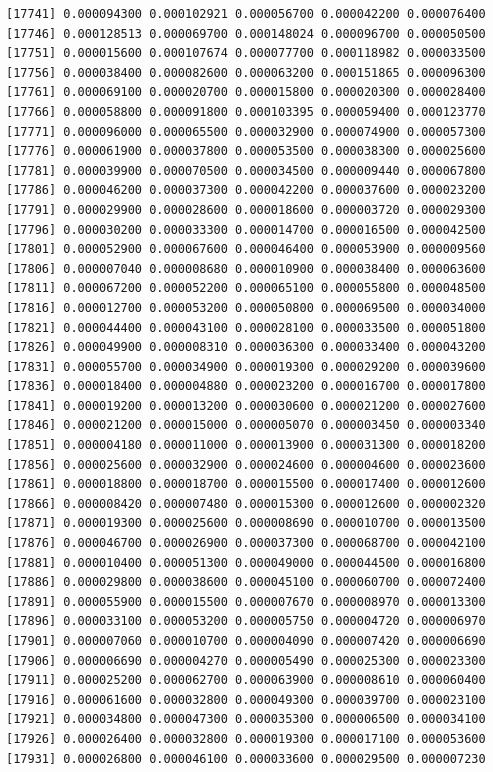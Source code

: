 \documentclass[]{article}
\begin{document}
\begin{verbatim}
[17741] 0.000094300 0.000102921 0.000056700 0.000042200 0.000076400
[17746] 0.000128513 0.000069700 0.000148024 0.000096700 0.000050500
[17751] 0.000015600 0.000107674 0.000077700 0.000118982 0.000033500
[17756] 0.000038400 0.000082600 0.000063200 0.000151865 0.000096300
[17761] 0.000069100 0.000020700 0.000015800 0.000020300 0.000028400
[17766] 0.000058800 0.000091800 0.000103395 0.000059400 0.000123770
[17771] 0.000096000 0.000065500 0.000032900 0.000074900 0.000057300
[17776] 0.000061900 0.000037800 0.000053500 0.000038300 0.000025600
[17781] 0.000039900 0.000070500 0.000034500 0.000009440 0.000067800
[17786] 0.000046200 0.000037300 0.000042200 0.000037600 0.000023200
[17791] 0.000029900 0.000028600 0.000018600 0.000003720 0.000029300
[17796] 0.000030200 0.000033300 0.000014700 0.000016500 0.000042500
[17801] 0.000052900 0.000067600 0.000046400 0.000053900 0.000009560
[17806] 0.000007040 0.000008680 0.000010900 0.000038400 0.000063600
[17811] 0.000067200 0.000052200 0.000065100 0.000055800 0.000048500
[17816] 0.000012700 0.000053200 0.000050800 0.000069500 0.000034000
[17821] 0.000044400 0.000043100 0.000028100 0.000033500 0.000051800
[17826] 0.000049900 0.000008310 0.000036300 0.000033400 0.000043200
[17831] 0.000055700 0.000034900 0.000019300 0.000029200 0.000039600
[17836] 0.000018400 0.000004880 0.000023200 0.000016700 0.000017800
[17841] 0.000019200 0.000013200 0.000030600 0.000021200 0.000027600
[17846] 0.000021200 0.000015000 0.000005070 0.000003450 0.000003340
[17851] 0.000004180 0.000011000 0.000013900 0.000031300 0.000018200
[17856] 0.000025600 0.000032900 0.000024600 0.000004600 0.000023600
[17861] 0.000018800 0.000018700 0.000015500 0.000017400 0.000012600
[17866] 0.000008420 0.000007480 0.000015300 0.000012600 0.000002320
[17871] 0.000019300 0.000025600 0.000008690 0.000010700 0.000013500
[17876] 0.000046700 0.000026900 0.000037300 0.000068700 0.000042100
[17881] 0.000010400 0.000051300 0.000049000 0.000044500 0.000016800
[17886] 0.000029800 0.000038600 0.000045100 0.000060700 0.000072400
[17891] 0.000055900 0.000015500 0.000007670 0.000008970 0.000013300
[17896] 0.000033100 0.000053200 0.000005750 0.000004720 0.000006970
[17901] 0.000007060 0.000010700 0.000004090 0.000007420 0.000006690
[17906] 0.000006690 0.000004270 0.000005490 0.000025300 0.000023300
[17911] 0.000025200 0.000062700 0.000063900 0.000008610 0.000060400
[17916] 0.000061600 0.000032800 0.000049300 0.000039700 0.000023100
[17921] 0.000034800 0.000047300 0.000035300 0.000006500 0.000034100
[17926] 0.000026400 0.000032800 0.000019300 0.000017100 0.000053600
[17931] 0.000026800 0.000046100 0.000033600 0.000029500 0.000007230

\end{verbatim}
\end{document}
